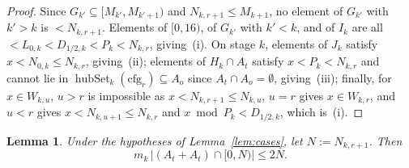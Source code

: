 \documentclass[11pt,a4paper]{amsart}
\newtheorem{lemma}{Lemma}
\newcommand{\hubSet}{\operatorname{hubSet}}
\begin{document}
\begin{proof}
Since $G_{k'} \subseteq [M_{k'}, M_{k'+1})$ and $N_{k,r+1} \le M_{k+1}$, no element of $G_{k'}$ with $k' > k$ is $< N_{k,r+1}$. Elements of $[0, 16)$, of $G_{k'}$ with $k' < k$, and of $I_k$ are all $< L_{0,k} < D_{1/2,k} < P_k < N_{k,r}$, giving~(i). On stage $k$, elements of $J_k$ satisfy $x < N_{0,k} \le N_{k,r}$, giving~(ii); elements of $H_k \cap A_t$ satisfy $x < P_k < N_{k,r}$ and cannot lie in $\hubSet_k(\mathrm{cfg}_r) \subseteq A_o$ since $A_t \cap A_o = \emptyset$, giving~(iii); finally, for $x \in W_{k,u}$, $u > r$ is impossible as $x < N_{k,r+1} \le N_{k,u}$, $u = r$ gives $x \in W_{k,r}$, and $u < r$ gives $x < N_{k,u+1} \le N_{k,r}$ and $x \bmod P_k < D_{1/2,k}$, which is~(i).
\end{proof}

\begin{lemma}\label{lem:upper}
Under the hypotheses of Lemma~\ref{lem:cases}, let $N := N_{k,r+1}$. Then
\[
m_k \, |(A_t + A_t) \cap [0, N)| \le 2 N.
\]
\end{lemma}
\end{document}
